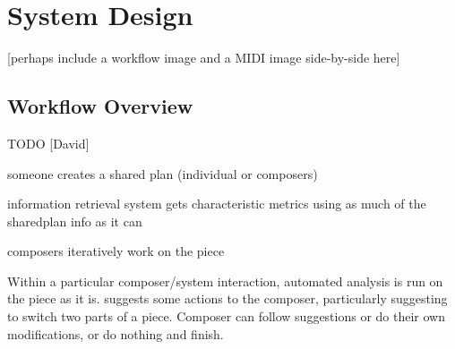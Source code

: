 \documentclass[final,authoryear,11pt,times]{elsarticle}
\begin{document}







\section{System Design}

[perhaps include a workflow image and a MIDI image side-by-side here]

\subsection{Workflow Overview}

TODO [David]

someone creates a shared plan (individual or composers)

information retrieval system gets characteristic metrics using as much of the sharedplan info as it can

composers iteratively work on the piece

Within a particular composer/system interaction, automated analysis is run on the piece as it is.
suggests some actions to the composer, particularly suggesting to switch two parts of a piece.
Composer can follow suggestions or do their own modifications, or do nothing and finish.
\end{document}
